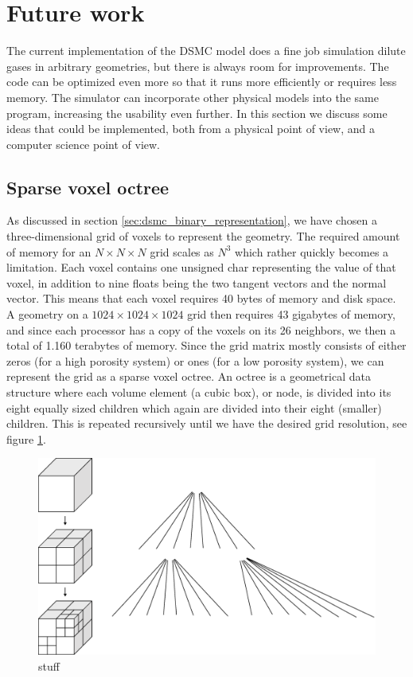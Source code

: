 \section{Future work}
The current implementation of the DSMC model does a fine job simulation dilute gases in arbitrary geometries, but there is always room for improvements. The code can be optimized even more so that it runs more efficiently or requires less memory. The simulator can incorporate other physical models into the same program, increasing the usability even further. In this section we discuss some ideas that could be implemented, both from a physical point of view, and a computer science point of view.
\subsection{Sparse voxel octree}
As discussed in section \ref{sec:dsmc_binary_representation}, we have chosen a three-dimensional grid of voxels to represent the geometry. The required amount of memory for an $N\times N\times N$ grid scales as $N^3$ which rather quickly becomes a limitation. Each voxel contains one unsigned char representing the value of that voxel, in addition to nine floats being the two tangent vectors and the normal vector. This means that each voxel requires 40 bytes of memory and disk space. A geometry on a $1024\times1024\times1024$ grid then requires 43 gigabytes of memory, and since each processor has a copy of the voxels on its 26 neighbors, we then a total of 1.160 terabytes of memory. Since the grid matrix mostly consists of either zeros (for a high porosity system) or ones (for a low porosity system), we can represent the grid as a sparse voxel octree\cite{laine2011efficient}. An octree is a geometrical data structure where each volume element (a cubic box), or node, is divided into its eight equally sized children which again are divided into their eight (smaller) children.  This is repeated recursively until we have the desired grid resolution, see figure \ref{fig:future_work_octree}. 
\begin{figure}[h]
\begin{center}
\includegraphics[width=\textwidth, trim=0cm 0cm 0cm 0cm, clip]{figures/octree.eps}
\end{center}
\caption{stuff}
\label{fig:future_work_octree}
\end{figure}
